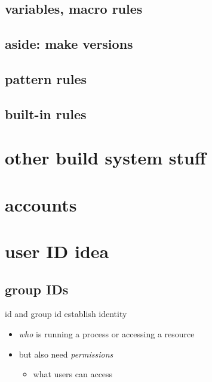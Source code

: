 \subsection{variables, macro rules}



\subsection{aside: make versions}



\subsection{pattern rules}



\subsection{built-in rules}



\section{other build system stuff}



\section{accounts}


\section{user ID idea}


\subsection{group IDs}


\begin{frame}{id and group id establish identity}
    \begin{itemize}
        \item \textit{who} is running a process or accessing a resource
        \item but also need \textit{permissions}
            \begin{itemize}
            \item what users can access
            \end{itemize}
    \end{itemize}
\end{frame}


